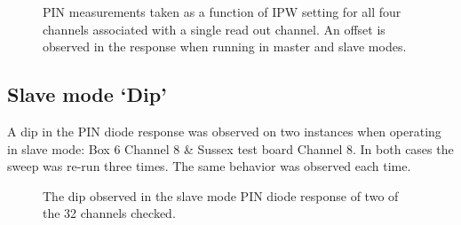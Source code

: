 \documentclass[12pt]{report}
\begin{document}
\begin{figure}[htp]
	\centering
	\caption{PIN measurements taken as a function of IPW setting for all four channels associated with a single read out channel. An offset is observed in the response when running in master and slave modes.}
	\label{fig:PINDiscrepancy} 
\end{figure}

\subsection{Slave mode `Dip'}
A dip in the PIN diode response was observed on two instances when operating in slave mode: Box 6 Channel 8 \& Sussex test board Channel 8. In both cases the sweep was re-run three times. The same behavior was observed each time.

\begin{figure}[htp]
	\centering
	\caption{The dip observed in the slave mode PIN diode response of two of the 32 channels checked.}
	\label{fig:PINDip} 
\end{figure}
\end{document}
